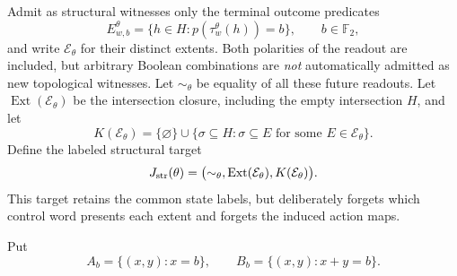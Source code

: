 \documentclass[11pt]{article}
\theoremstyle{definition}
\begin{document}
Admit as structural witnesses only the terminal outcome predicates
\[
 E_{w,b}^\theta=\{h\in H:p(\tau_w^\theta(h))=b\},
 \qquad b\in\mathbb F_2,
\]
and write $\mathcal E_\theta$ for their distinct extents. Both polarities
of the readout are included, but arbitrary Boolean combinations are
\emph{not} automatically admitted as new topological witnesses. Let
$\sim_\theta$ be equality of all these future readouts. Let
$\operatorname{Ext}(\mathcal E_\theta)$ be the intersection closure,
including the empty intersection $H$, and let
\[
 K(\mathcal E_\theta)
 =\{\varnothing\}\cup\{\sigma\subseteq H:
                      \sigma\subseteq E\text{ for some }E\in\mathcal E_\theta\}.
\]
Define the labeled structural target
\[
 J_{\rm str}(\theta)
 =\bigl(\sim_\theta,\operatorname{Ext}(\mathcal E_\theta),
                     K(\mathcal E_\theta)\bigr).
\]
This target retains the common state labels, but deliberately forgets which
control word presents each extent and forgets the induced action maps.

Put
\[
 A_b=\{(x,y):x=b\},\qquad B_b=\{(x,y):x+y=b\}.
\]
\end{document}
